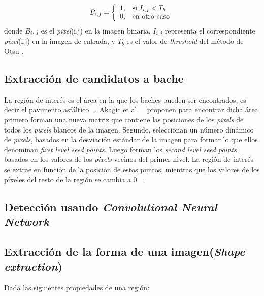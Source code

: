 $$B_{i,j}=\left\{
    \begin{array}{c l}
        1, & \text{si } I_{i,j} < T_{b}\\
        0, & \text{en otro caso}\\
    \end{array}
\right.$$
donde $B_i,j$ es el \emph{pixel}(i,j) en la imagen binaria, $I_{i,j}$ representa el correspondiente \emph{pixel}(i,j) en la imagen de entrada, y
$T_b$ es el valor de \emph{threshold} del método de Otsu .

\subsection{Extracción de candidatos a bache}
La región de interés es el área en la que los baches pueden ser encontrados, es decir el pavimento asfáltico ~.
Akagic et al. ~ proponen para encontrar dicha área  primero forman una nueva matriz que contiene las posiciones 
de los \emph{pixels} de todos los \emph{pixels} blancos de la imagen. Segundo, seleccionan un número dinámico de \emph{pixels}, basados 
en la desviación estándar de la imagen para formar lo que ellos denominan \emph{first level seed points}. Luego forman  los 
\emph{second level seed points} basados en los valores de los \emph{pixels} vecinos del primer nivel. La región de
interés se extrae en función de la posición de estos puntos, mientras que los valores de los píxeles del resto de la región se cambia a
0 ~.




\subsection{Detección usando \emph{Convolutional Neural Network}}

	\subsection{Extracción de la forma de una imagen(\emph{Shape extraction})}
	Dada las siguientes propiedades de una región:\\

